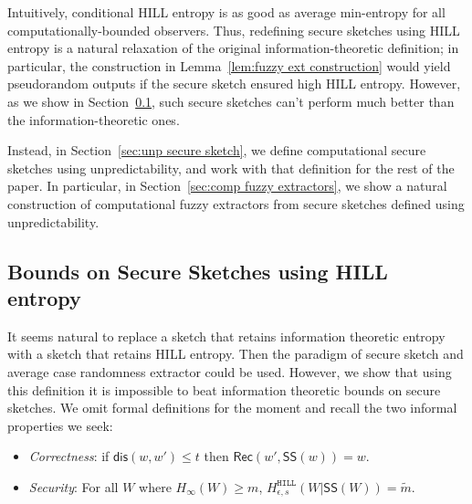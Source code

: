 \documentclass[11pt]{article}
\newcommand{\secref}[1]{\mbox{Section~\ref{#1}}}
\newcommand{\lemref}[1]{\mbox{Lemma~\ref{#1}}}
\newcommand{\class}[1]{{\ensuremath{\mathsf{#1}}}}
\newcommand{\sketch}{\ensuremath{\class{SS}}\xspace}
\newcommand{\rec}{\ensuremath{\class{Rec}}\xspace}
\newcommand{\dis}{\ensuremath{\mathsf{dis}}}
\newcommand{\hill}{\ensuremath{\mathtt{HILL}}\xspace}
\begin{document}
Intuitively, conditional HILL entropy is as good as average min-entropy for all computationally-bounded observers.  Thus, redefining secure sketches using HILL entropy is a  natural relaxation of the original information-theoretic definition; in particular, the construction in \lemref{lem:fuzzy ext construction} would yield pseudorandom outputs if the secure sketch ensured high HILL entropy.  However, as we show in Section~\ref{sec:imp HILL sketch}, such secure sketches can't perform much better than the information-theoretic ones.

Instead, in \secref{sec:unp secure sketch}, we define computational secure sketches using unpredictability, and work with that definition for the rest of the paper.  In particular, in \secref{sec:comp fuzzy extractors}, we show a natural construction of computational fuzzy extractors from secure sketches defined using unpredictability.


\subsection{Bounds on Secure Sketches using HILL entropy}
\label{sec:imp HILL sketch}
It seems natural to replace a sketch that retains information theoretic entropy with a sketch that retains HILL entropy.  Then the paradigm of secure sketch and average case randomness extractor could be used. However, we show that using this definition it is impossible to beat information theoretic bounds on secure sketches.  We omit formal definitions for the moment and recall the two informal properties we seek:
\begin{itemize}
\item \emph{Correctness}: if $\dis(w, w')\leq t$ then $\rec(w', \sketch(w)) = w$.
\item \emph{Security}: For all $W$ where $H_\infty(W)\geq m$, $H^\hill_{\epsilon, s}(W|\sketch(W))  = \tilde{m}$.
\end{itemize}
\end{document}
